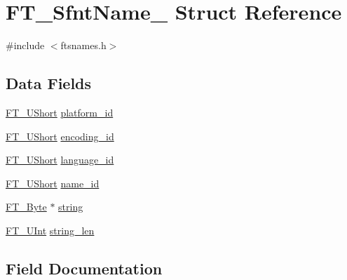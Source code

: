\hypertarget{struct_f_t___sfnt_name__}{}\section{F\+T\+\_\+\+Sfnt\+Name\+\_\+ Struct Reference}
\label{struct_f_t___sfnt_name__}


{\ttfamily \#include $<$ftsnames.\+h$>$}

\subsection*{Data Fields}
\begin{DoxyCompactItemize}
\item 
\hyperlink{fttypes_8h_a937f6c17cf5ffd09086d8610c37b9f58}{F\+T\+\_\+\+U\+Short} \hyperlink{struct_f_t___sfnt_name___ae92450a058eb4737df85f66226d69f43}{platform\+\_\+id}
\item 
\hyperlink{fttypes_8h_a937f6c17cf5ffd09086d8610c37b9f58}{F\+T\+\_\+\+U\+Short} \hyperlink{struct_f_t___sfnt_name___a01f4573605eab3f4d2e4b9b50b0de98f}{encoding\+\_\+id}
\item 
\hyperlink{fttypes_8h_a937f6c17cf5ffd09086d8610c37b9f58}{F\+T\+\_\+\+U\+Short} \hyperlink{struct_f_t___sfnt_name___a6fb23e0f299a97b25b63805b04cf1fc5}{language\+\_\+id}
\item 
\hyperlink{fttypes_8h_a937f6c17cf5ffd09086d8610c37b9f58}{F\+T\+\_\+\+U\+Short} \hyperlink{struct_f_t___sfnt_name___ac07be3e852408990fe0a910f00b68f4e}{name\+\_\+id}
\item 
\hyperlink{fttypes_8h_a51f26183ca0c9f4af958939648caeccd}{F\+T\+\_\+\+Byte} $\ast$ \hyperlink{struct_f_t___sfnt_name___ab369e2c3d8dc9662f69c53e4d3158067}{string}
\item 
\hyperlink{fttypes_8h_abcb8db4dbf35d2b55a9e8c7b0926dc52}{F\+T\+\_\+\+U\+Int} \hyperlink{struct_f_t___sfnt_name___a4ebdb7207b5681d16f9cc17f432cb56f}{string\+\_\+len}
\end{DoxyCompactItemize}


\subsection{Field Documentation}
\mbox{\label{struct_f_t___sfnt_name___a01f4573605eab3f4d2e4b9b50b0de98f}} 
